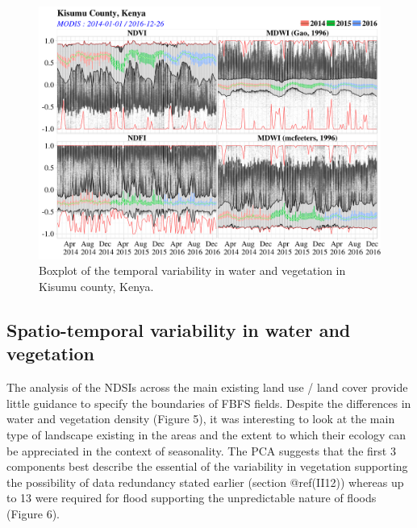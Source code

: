\documentclass[12pt,oneside]{article}
\begin{document}
\begin{figure}
\includegraphics[width=1\linewidth]{figures/Mapping_FBFS_boxplot_temporal_variability} \caption{Boxplot of the temporal variability in water and vegetation in Kisumu county, Kenya.}\label{fig:fig5}
\end{figure}

\hypertarget{II3}{%
\subsection{Spatio-temporal variability in water and vegetation}\label{II3}}

The analysis of the NDSIs across the main existing land use / land cover provide little guidance to specify the boundaries of FBFS fields. Despite the differences in water and vegetation density (Figure 5), it was interesting to look at the main type of landscape existing in the areas and the extent to which their ecology can be appreciated in the context of seasonality. The PCA suggests that the first 3 components best describe the essential of the variability in vegetation supporting the possibility of data redundancy stated earlier (section @ref(II12)) whereas up to 13 were required for flood supporting the unpredictable nature of floods (Figure 6).
\end{document}
